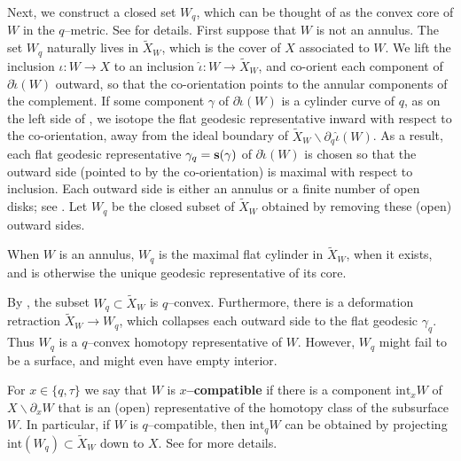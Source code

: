 \documentclass[11pt,letterpaper]{amsart}
\newcommand{\s}{\mathbf{s}}
\newcommand{\wt}{\widetilde}
\newcommand{\mr}{\mathring}
\newcommand{\bdy}{\partial} %
\numberwithin{equation}{section}
\theoremstyle{definition}
\newcommand{\define}[1]{\textbf{#1}}
\renewcommand{\setminus}{\smallsetminus}
\newcommand{\from}{\colon} %
\renewcommand{\s}{{\bf s}}
\renewcommand{\int}{\mathrm{int}}
\newcommand{\dave}[1]{{\color{darkgreen}{#1}}}
\begin{document}
Next, we construct a closed set $W_q$, 
which can be thought of as the convex core of $W$ in the $q$--metric. See \cite[Section 2.4]{MinskyTaylor:SubsurfaceDist} for details. First suppose that $W$ is not an annulus. 
The set $W_q$ naturally lives in $\wt X_W$, which is the cover of $X$ associated to $W$. 
We lift the inclusion $\iota \from W \to X$ to an inclusion $\hat \iota \from W \to \wt X_W$,
and co-orient each component of $\bdy \hat \iota(W)$ outward, so that the co-orientation points to the annular components of the complement. If some component $\gamma$ of $\bdy \hat \iota(W)$ is a cylinder curve of $q$, as on the left side of , we isotope the flat geodesic representative inward with respect to the co-orientation, away from the ideal boundary of $\wt X_W \setminus \bdy_q \hat \iota(W)$. As a result, each flat geodesic representative $\gamma_q = \s(\gamma)$ of $\bdy \hat \iota(W)$ is chosen so that the outward side (pointed to by the co-orientation) is maximal with respect to inclusion.
Each outward side is either an annulus or a finite number of open disks; see 
. Let $W_q$ be the closed subset of $\wt X_W$ obtained by removing these (open) outward sides.

When $W$ is an annulus, $W_q$ is the maximal flat cylinder in $\wt X_W$, when it exists, and is otherwise the unique geodesic representative of its core. 

%    

By  \cite[Lemma 2.6]{MinskyTaylor:FiberedFaces}, the subset $W_q \subset \wt X_W$ is $q$--convex. Furthermore, there is a deformation retraction $\wt X_W \to W_q$, which collapses each outward side to the flat geodesic $\gamma_q$. Thus $W_q$ is a $q$--convex homotopy representative of $W$. However, $W_q$ might fail to be a surface, and might even have empty interior. 

For $x\in \{q, \tau \}$ 
we say that $W$ is \define{$x$--compatible} if there is a component $\int_x W$ of $X \setminus \bdy_x W$ that is an (open) representative of the homotopy class of the subsurface $W$. In particular, if $W$ is $q$--compatible, then $\int_q W $ can be obtained by projecting 
 $\int(W_q) \subset \wt X_W$ down to $X$.
See \cite[Section 2.4]{MinskyTaylor:SubsurfaceDist}  for more details.
\end{document}
